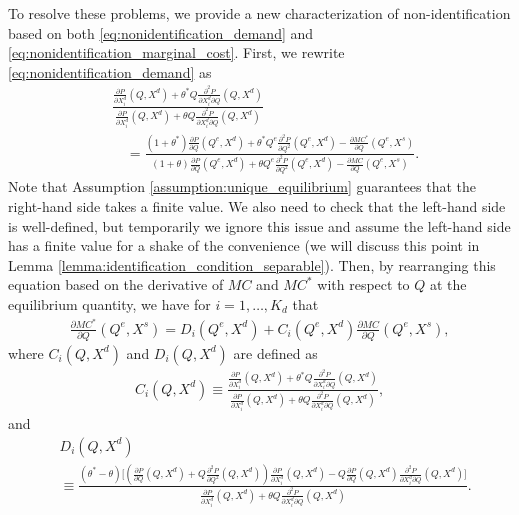 \documentclass[11pt, a4paper]{article}
\theoremstyle{remark}
\begin{document}
To resolve these problems, we provide a new characterization of non-identification based on both \eqref{eq:nonidentification_demand} and \eqref{eq:nonidentification_marginal_cost}.
First, we rewrite \eqref{eq:nonidentification_demand} as
\begin{align}
    &\frac{\frac{\partial P}{\partial X^{d}_i}(Q, X^{d}) + \theta^{*} Q\frac{\partial^2 P}{\partial X^{d}_{i}\partial Q}(Q, X^{d}) }{\frac{\partial P}{\partial X^{d}_i}(Q, X^{d}) + \theta Q\frac{\partial^2 P}{\partial X^{d}_{i}\partial Q}(Q, X^{d}) }\\ 
    & \quad = \frac{(1+\theta^{*})\frac{\partial P}{\partial Q}(Q^e, X^{d}) + \theta^{*} Q^e\frac{\partial^2 P}{\partial Q^2}(Q^e, X^{d}) - \frac{\partial MC^{*}}{\partial Q}(Q^e, X^{s})}{(1+\theta)\frac{\partial P}{\partial Q}(Q^e, X^{d}) + \theta Q^e\frac{\partial^2 P}{\partial Q^2}(Q^e, X^{d}) - \frac{\partial MC}{\partial Q}(Q^e, X^{s})}.
\end{align}
Note that Assumption \ref{assumption:unique_equilibrium} guarantees that the right-hand side takes a finite value.
We also need to check that the left-hand side is well-defined, but temporarily we ignore this issue and
assume the left-hand side has a finite value for a shake of the convenience (we will discuss this point in Lemma \ref{lemma:identification_condition_separable}).
Then, by rearranging this equation based on the derivative of $MC$ and $MC^{*}$ with respect to $Q$ at the equilibrium quantity, we have for $i = 1, \ldots, K_d$ that
\begin{align}
    \frac{\partial MC^{*}}{\partial Q}(Q^e, X^{s}) =D_i(Q^e, X^{d}) + C_i(Q^e, X^{d})\frac{\partial MC}{\partial Q}(Q^e, X^{s}),\label{eq:mc_transformation_quantity}
\end{align}
where $C_i(Q, X^{d})$ and $D_i(Q, X^{d})$ are defined as
\begin{align}
    C_i(Q, X^{d}) \equiv \frac{\frac{\partial P}{\partial X^{d}_i}(Q, X^{d}) + \theta^{*} Q\frac{\partial^2 P}{\partial X^{d}_{i}\partial Q}(Q, X^{d}) }{\frac{\partial P}{\partial X^{d}_i}(Q, X^{d}) + \theta Q\frac{\partial^2 P}{\partial X^{d}_{i}\partial Q}(Q, X^{d}) },\label{eq:ratio_marginal_revenue}
\end{align}
and
\begin{align}
    &D_i(Q, X^{d})\\
    &\equiv\frac{(\theta^{*} - \theta)\Bigg[\left(\frac{\partial P}{\partial Q}(Q, X^{d}) + Q\frac{\partial^2 P}{\partial Q^2}(Q, X^{d})\right) \frac{\partial P}{\partial X^{d}_i}(Q, X^{d}) - Q \frac{\partial P}{\partial Q}(Q, X^{d}) \frac{\partial^2 P}{\partial X^{d}_i\partial Q}(Q, X^{d}) \Bigg]}{\frac{\partial P}{\partial X^{d}_i}(Q, X^{d}) + \theta Q\frac{\partial^2 P}{\partial X^{d}_{i}\partial Q}(Q, X^{d})}.\label{eq:intercation_derivative_demand}
\end{align}
\end{document}
